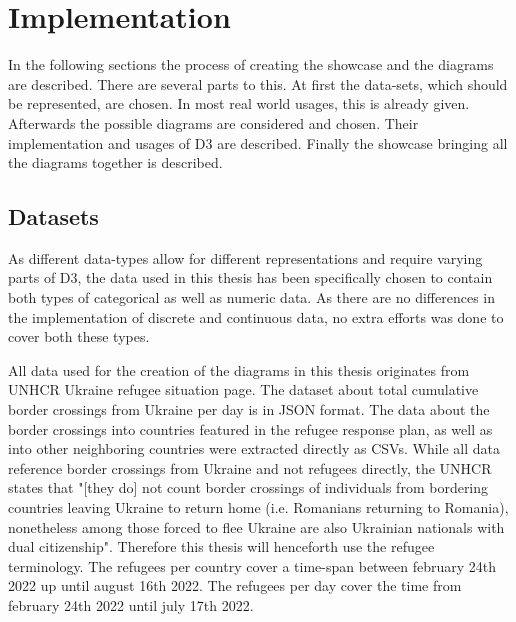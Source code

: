 \chapter{Implementation}


In the following sections the process of creating the showcase and the diagrams are described. There are several parts to this. At first the data-sets, which should be represented, are chosen. In most real world usages, this is already given. Afterwards the possible diagrams are considered and chosen. Their implementation and usages of D3 are described. Finally the showcase bringing all the diagrams together is described.

\section{Datasets}
As different data-types allow for different representations and require varying parts of D3, the data used in this thesis has been specifically chosen to contain both types of categorical as well as numeric data. As there are no differences in the implementation of discrete and continuous data, no extra efforts was done to cover both these types.

All data used for the creation of the diagrams in this thesis originates from UNHCR Ukraine refugee situation page\cite{unhcr}. The dataset about total cumulative border crossings from Ukraine per day\cite{unhcr_rpd} is in JSON format. The data about the border crossings into countries featured in the refugee response plan, as well as into other neighboring countries\cite{unhcr} were extracted directly as CSVs. While all data reference border crossings from Ukraine and not refugees directly, the UNHCR states that "[they do] not count border crossings of individuals from bordering countries leaving Ukraine to return home (i.e. Romanians returning to Romania), nonetheless among those forced to flee Ukraine are also Ukrainian nationals with dual citizenship"\cite{unhcr_note}. Therefore this thesis will henceforth use the refugee terminology.
The refugees per country cover a time-span between february 24th 2022 up until august 16th 2022\cite{unhcr}. The refugees per day cover the time from february 24th 2022 until july 17th 2022\cite{unhcr_rpd}.



